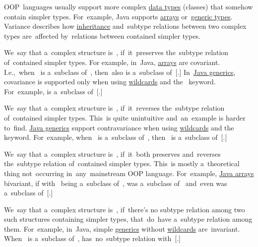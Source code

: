 OOP~languages usually support more complex \hyperref[datatypes]{data types} (classes) that somehow contain simpler types.
For~example, Java supports \hyperref[javaarray]{arrays} or~\hyperref[javagenerics]{generic types}.
Variance describes how \hyperref[inheritance]{inheritance} and~subtype relations between two complex types are~affected by~relations between contained simpler types.

\label{covariance}
We~say that a~complex structure is~, if~it~preserves the~subtype relation of~contained simpler types.
For example, in~Java, \hyperref[javaarray]{arrays} are covariant.
\mbox{I.e., when } is a~subclass of~, then~also  is a~subclass of~[.]
In~\hyperref[javagenerics]{Java generics}, covariance is supported only when using \hyperref[javagenericswildcards]{wildcards} and the~ keyword.
For~example,  is a~subclass of~[.]

We~say that a~complex structure is~, if~it~reverses the~subtype relation of~contained simpler types.
This~is quite unintuitive and~an~example is harder to~find.
\hyperref[javagenerics]{Java generics} support contravariance when using \hyperref[javagenericswildcards]{wildcards} and the~ keyword.
For~example, when~ is a~subclass of~, then~ is a~subclass of~[.]

We~say that a~complex structure is~, if~it~both preserves and~reverses the~subtype relation of~contained simpler types.
This~is mostly a~theoretical thing not~occurring in~any~mainstream OOP language.
For~example, \hyperref[javaarray]{Java arrays}  bivariant, if with~ being a~subclass of~,  was a~subclass of~ and~even  was a~subclass of~[.]

\label{invariance}
We~say that a~complex structure is~, if~there's no subtype relation among two such structures containing simpler types, that~do~have a~subtype relation among them.
For~example, in~Java, simple \hyperref[javagenerics]{generics} without \hyperref[javagenericswildcards]{wildcards} are~invariant.
When~ is a~subclass of~,  has~no~subtype relation with~[.]
